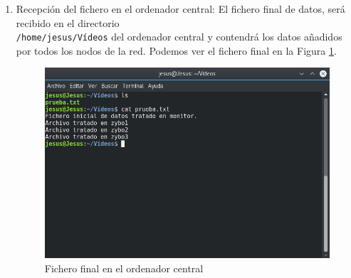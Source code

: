 \begin{enumerate}
\newpage
	\item Recepción del fichero en el ordenador central: El fichero final de datos, será recibido en el directorio\\ \texttt{/home/jesus/Vídeos} del ordenador central y contendrá los datos añadidos por todos los nodos de la red. Podemos ver el fichero final en la Figura \ref{Fichero final en el ordenador central}.
	\begin{figure}[h]
		\centering
		\includegraphics[scale=0.5]{Metodologia/Pruebas/Fichero_final_en_PC.png}
		\caption{Fichero final en el ordenador central}
		\label{Fichero final en el ordenador central}
	\end{figure}

\end{enumerate}